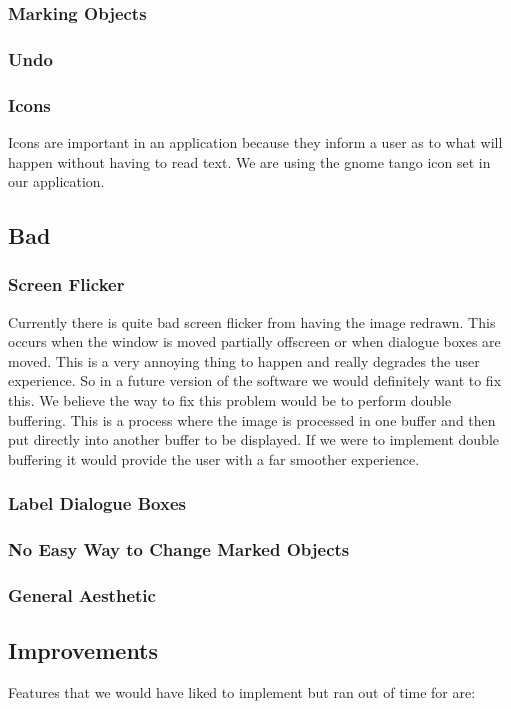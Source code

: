 \documentclass[a4paper,11pt,oneside]{article}
\begin{document}
\subsubsection{Marking Objects}
\subsubsection{Undo}
\subsubsection{Icons}
Icons are important in an application because they inform a user as to what will happen without having to read text.  We are using the gnome tango icon set in our application.  

\subsection{Bad}
\subsubsection{Screen Flicker}
Currently there is quite bad screen flicker from having the image redrawn.  This occurs when the window is moved partially offscreen or when dialogue boxes are moved.  This is a very annoying thing to happen and really degrades the user experience.  So in a future version of the software we would definitely want to fix this.  We believe the way to fix this problem would be to perform double buffering.  This is a process where the image is processed in one buffer and then put directly into another buffer to be displayed.  If we were to implement double buffering it would provide the user with a far smoother experience.
\subsubsection{Label Dialogue Boxes}
\subsubsection{No Easy Way to Change Marked Objects}
\subsubsection{General Aesthetic}

\subsection{Improvements}
Features that we would have liked to implement but ran out of time for are:
\end{document}
